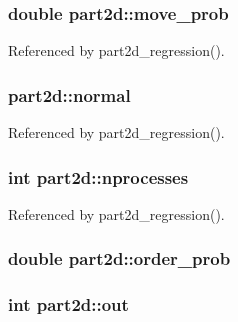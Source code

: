 \subsubsection[{\texorpdfstring{move\+\_\+prob}{move_prob}}]{\setlength{\rightskip}{0pt plus 5cm}double part2d\+::move\+\_\+prob}\hypertarget{structpart2d_a668d06034c4dc3690deb2a919c7203b2}{}\label{structpart2d_a668d06034c4dc3690deb2a919c7203b2}


Referenced by part2d\+\_\+regression().

\subsubsection[{\texorpdfstring{normal}{normal}}]{ part2d\+::normal}\hypertarget{structpart2d_a4a29a9791749706ade7ebdf251605eec}{}\label{structpart2d_a4a29a9791749706ade7ebdf251605eec}


Referenced by part2d\+\_\+regression().

\subsubsection[{\texorpdfstring{nprocesses}{nprocesses}}]{\setlength{\rightskip}{0pt plus 5cm}int part2d\+::nprocesses}\hypertarget{structpart2d_a8399e897ccade994c9e97d62b74df155}{}\label{structpart2d_a8399e897ccade994c9e97d62b74df155}


Referenced by part2d\+\_\+regression().

\subsubsection[{\texorpdfstring{order\+\_\+prob}{order_prob}}]{\setlength{\rightskip}{0pt plus 5cm}double part2d\+::order\+\_\+prob}\hypertarget{structpart2d_a3b1572226954d2a39593ee813414be4e}{}\label{structpart2d_a3b1572226954d2a39593ee813414be4e}
\subsubsection[{\texorpdfstring{out}{out}}]{\setlength{\rightskip}{0pt plus 5cm}int part2d\+::out}\hypertarget{structpart2d_a2f4c516b332c9597b755780a3830031b}{}\label{structpart2d_a2f4c516b332c9597b755780a3830031b}


